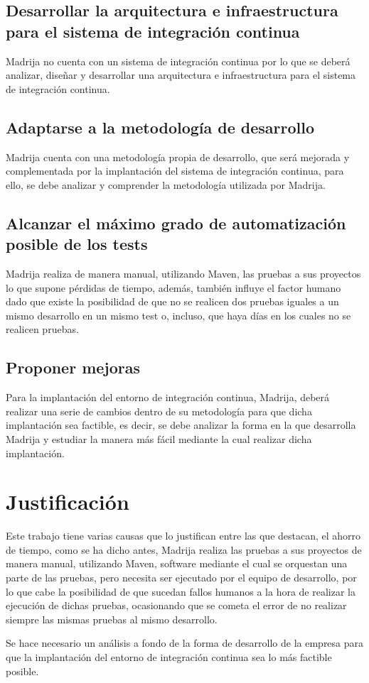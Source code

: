 \clearpage

\subsection{Desarrollar la arquitectura e infraestructura para el sistema de integración continua}
\ac{Madrija} no cuenta con un sistema de integración continua por lo que se deberá analizar, diseñar y desarrollar una arquitectura e infraestructura para el sistema de integración continua.

\subsection{Adaptarse a la metodología de desarrollo}

\ac{Madrija} cuenta con una metodología propia de desarrollo, que será mejorada y complementada por la implantación del sistema de integración continua, para ello, se debe analizar y comprender la metodología utilizada por \ac{Madrija}.

\subsection{Alcanzar el máximo grado de automatización posible de los tests}

\ac{Madrija} realiza de manera manual, utilizando Maven, las pruebas a sus proyectos lo que supone pérdidas de tiempo, además, también influye el factor humano dado que existe la posibilidad de que no se realicen dos pruebas iguales a un mismo desarrollo en un mismo test o, incluso, que haya días en los cuales no se realicen pruebas.

\subsection{Proponer mejoras}

Para la implantación del entorno de integración continua, \ac{Madrija}, deberá realizar una serie de cambios dentro de su metodología para que dicha implantación sea factible, es decir, se debe analizar la forma en la que desarrolla \ac{Madrija} y estudiar la manera más fácil mediante la cual realizar dicha implantación.

\section{Justificación}

Este trabajo tiene varias causas que lo justifican entre las que destacan, el ahorro de tiempo, como se ha dicho antes, \ac{Madrija} realiza las pruebas a sus proyectos de manera manual, utilizando Maven, software mediante el cual se orquestan una parte de las pruebas, pero necesita ser ejecutado por el equipo de desarrollo, por lo que cabe la posibilidad de que sucedan fallos humanos a la hora de realizar la ejecución de dichas pruebas, ocasionando que se cometa el error de no realizar siempre las mismas pruebas al mismo desarrollo.

Se hace necesario un análisis a fondo de la forma de desarrollo de la empresa para que la implantación del entorno de integración continua sea lo más factible posible.

